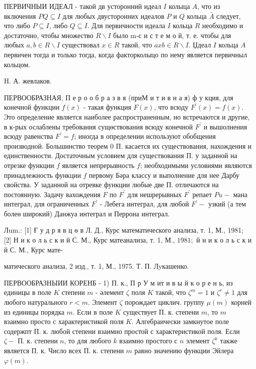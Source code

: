 \documentclass[10pt]{article}
\begin{document}
ПЕРВИЧНЫИ ИДЕАЛ - такой дв усторонний идеал $I$ колыца $A$, что из включения $P Q \subseteq I$ для любых двусторонних идеалов $P$ и $Q$ кольца $\bar{A}$ следует, что либо $P \subseteq I$, либо $Q \subseteq I$. Для первичности идеала $I$ кольца $R$ необходимо и достаточно, чтобы множество $R \backslash I$ было m-с и с т е м о й, т. е. чтобы для любых $a, b \in R \backslash I$ существовал $x \in R$ такой, что $a x b \in R \backslash I$. Џдеал $I$ кольца $A$ первичен тогда и только тогда, когда факторколыцо по нему является первичныл кольцом.



H. А. жевлаков.



ПЕРВООБРАЗНАЯ, П е р о о б р а з в я (приМ и т и в н а я) ф у кция, для конечной функции $f(x)$ - такая функция $F(x)$, что всюду $F^{\prime}(x)=f(x)$. Это определение является наиболее распространенным, но встречаются и другие, в к-рых ослаблены требования сущөствования всюду конечной $F^{\prime}$ и вышолнения всюду равенства $F^{\prime}=f$; иногда в определении используют обобщения производной. Большинство теорем 0 П. касается их существования, нахождения и единственности. Достаточным условием для существования П. у заданной на отрезке функции $f$ является непрерывность $f$; необходимыми условиями являются принадлежность функции $f$ первому Бәра классу и выполнение для нее Дарбу свойства. У заданной на отревке функции любые две П. отличаются на постоянную. Задачу вахождения $F$ по $F^{\prime}$ для нешрерывных $F^{\prime}$ репает $P u-$ мана интеграл, для ограниченных $F^{\prime}$ - Лебега интеграл, для любой $F^{\prime}-$ узкий (а тем болеө широкий) Данжуа интеграл и Перрона интеграл.



Лum.: [1] Ғ у д р я в ц ө в Л. Д., Курс математического анализа, т. 1, М., 1981; [2] Н и к о л ь с к и й С. М., Курс матеанализа, т. 1, М., $1981 ;$ й н и к о л ь с к и й С. М., Курс мате-

матического анализа, 2 изд., т. 1, М., 1975. Т. П. Лyкашенко.



ПЕРВООБРАЗНЫИИ КОРЕНБ - 1) П. к., П р У м ит и в ы й к о р е н ь, из единицы в поле $K$ степени $m$ - әлемент $\zeta$ поля $K$ такой, что $\zeta^{m}=1$ и $\zeta^{r} \neq 1$ для любого натурального $r<m$. Элемент $\zeta$ порождает циклич. группу $\mu(m)$ корней из единицы порядка $m$. Если в поле $K$ существует П. к. степени $m$, то $m$ взаимно просто с характеристикой поля $K$. Алгебраически замкнутое поле содержпт П. к. любой степени взаимно простой с характеристикой поля. Если $\zeta-$ П. к. степени $n$, то для любого $k$ взаимно простого с $n$ элемент $\zeta^{k}$ также является П. к. Число всех П. к. степени $m$ равно значению функции Эйлера $\varphi(m)$.
\end{document}
